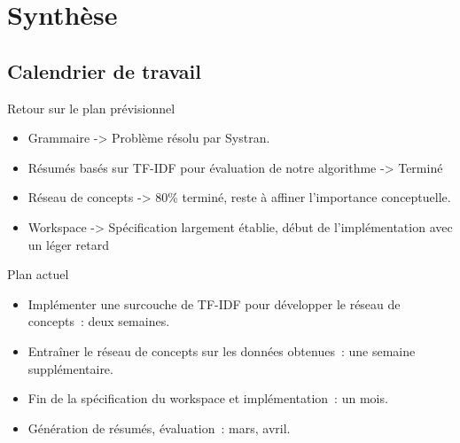 \documentclass{beamer}
\begin{document}
\section{Synthèse}
\subsection{Calendrier de travail}
\begin{frame}
	\begin{block}{Retour sur le plan prévisionnel}
		\begin{itemize}
			\item Grammaire -> Problème résolu par Systran.
			\item Résumés basés sur TF-IDF pour évaluation de notre algorithme -> Terminé
			\item Réseau de concepts -> 80\% terminé, reste à affiner l'importance conceptuelle.
			\item Workspace -> Spécification largement établie, début de l'implémentation avec un léger retard
		\end{itemize}
	\end{block}
\end{frame}

\begin{frame}
	\begin{block}{Plan actuel}
		\begin{itemize}
			\item Implémenter une surcouche de TF-IDF pour développer le réseau de concepts~: deux semaines.
			\item Entraîner le réseau de concepts sur les données obtenues~: une semaine supplémentaire.
			\item Fin de la spécification du workspace et implémentation~: un mois.
			\item Génération de résumés, évaluation~: mars, avril.
		\end{itemize}
	\end{block}
\end{frame}
\end{document}
